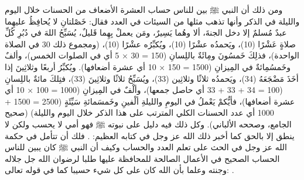 ومن ذلك أن النبي ﷺ  بين للناس حساب العشرة الأضعاف من الحسنات خلال اليوم والليلة في الذكر وأنها تذهب مثلها من السيئات في العدد فقال: خَصْلتانِ لا يُحافِظُ عليهِما عبدٌ مُسلمٌ إلا دخل الجنةَ، ألا وهُما يَسِيرٌ، ومَن يعملْ بِهِما قَليلٌ، يُسَبِّحُ اللهَ في دُبُرِ كُلِّ صلاةٍ عَشْرًا (10)، ويَحمدُه عشْرًا (10)، ويُكبِّرُه عشْرًا (10)، (ومجموع ذلك 30 في الصلاة الواحدة)، فذلِكَ خَمسُونَ ومِائَةٌ باللِسانِ (150 = 30 × 5 أي في الصلوات الخمس)، وألفٌ وخَمسُمِائةٌ في المِيزانِ (1500 = 150 × 10 أي عشرة أضعافها). ويُكبِّرُ أربعًا وثلاثِينَ إذا أخَذَ مَضْجَعَهُ (34)، ويَحمدُه ثلاثًا وثلاثِين (33)، ويُسَبِّحُ ثلاثًا وثلاثِينَ (33)، فتِلكَ مائةٌ باللِسانِ (100 = 34 + 33 + 33 أي حاصل جمعها)، وألْفٌ في المِيزانِ (1000 = 100 × 10 أي عشرة أضعافها)، فأيُّكمْ يَعْملُ في اليومِ والليلةِ ألْفينِ وخَمسَمائةِ سَيِّئَةٍ (2500 = 1500 + 1000 أي عدد الحسنات الكلي المترتب على هذا الذكر خلال اليوم والليلة) {\footnotesize (صحيح الجامع، وصححه الألباني)}. وكل ذلك فيه دليل على نبوته ﷺ فهو أمي لا يحسب ولكن لا ينطق إلا بالحق كما أخبر ذلك الله عز وجل في كتابه العظيم:
\quranayah*[53][3-4]{\footnotesize \surahname*[53]}. فلك أن تتأمل في حكمة الله عز وجل في الحث على تعلم العدد والحساب وكيف أن النبي ﷺ كان يبين للناس الحساب الصحيح في الأعمال الصالحة للمحافظة عليها طلبا لرضوان الله جل جلاله وجنته وعلما بأن الله كان على كل شيء حسيبا كما في قوله تعالى: \quranayah*[4][86-87]{\footnotesize \surahname*[4]}.

